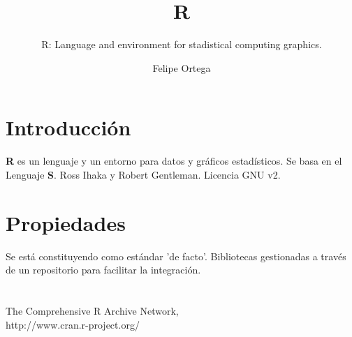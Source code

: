 \documentclass[11pt]{scrartcl}
\title{\textbf{R}}
\subtitle{R: Language and environment for stadistical computing graphics.}
\author{Felipe Ortega}
\begin{document}
\maketitle

\section{Introducci\'on}

\textbf{R} es un lenguaje y un entorno para datos y gr\'aficos estad\'isticos.
Se basa en el Lenguaje \textbf{S}. 
Ross Ihaka y Robert Gentleman.
Licencia  GNU v2.

\section{Propiedades}

Se est\'a constituyendo como est\'andar 'de facto'.
Bibliotecas gestionadas a trav\'es de un repositorio para facilitar la integraci\'on.

\section{}

\begin{thebibliography}{9}

  The Comprehensive R Archive Network,\\
  http://www.cran.r-project.org/

\end{thebibliography}
\end{document}

